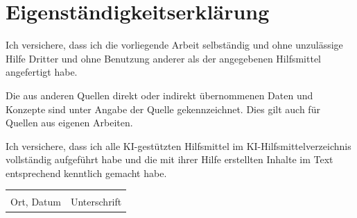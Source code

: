 \section*{Eigenständigkeitserklärung}

Ich versichere, dass ich die vorliegende Arbeit selbständig und ohne unzulässige Hilfe
Dritter und ohne Benutzung anderer als der angegebenen Hilfsmittel angefertigt habe.

Die aus anderen Quellen direkt oder indirekt übernommenen Daten und Konzepte sind
unter Angabe der Quelle gekennzeichnet. Dies gilt auch für Quellen aus eigenen Arbeiten.

Ich versichere, dass ich alle KI-gestützten Hilfsmittel im KI-Hilfsmittelverzeichnis
vollständig aufgeführt habe und die mit ihrer Hilfe erstellten Inhalte im Text
entsprechend kenntlich gemacht habe.

\vspace{2cm}

\noindent
\begin{tabular}{@{}p{6cm}p{6cm}@{}}
  \hrulefill & \hrulefill \\
  Ort, Datum & Unterschrift \\
\end{tabular}
